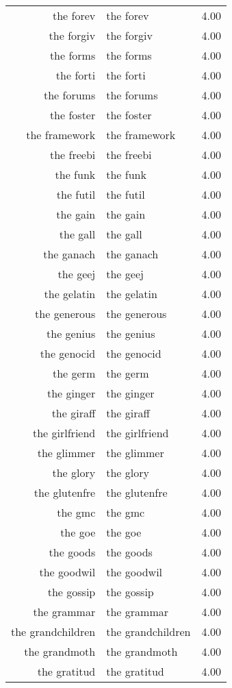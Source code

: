 \begin{table}[ht]
\begin{tabular}{rlr}
  the forev & the forev & 4.00 \\ 
  the forgiv & the forgiv & 4.00 \\ 
  the forms & the forms & 4.00 \\ 
  the forti & the forti & 4.00 \\ 
  the forums & the forums & 4.00 \\ 
  the foster & the foster & 4.00 \\ 
  the framework & the framework & 4.00 \\ 
  the freebi & the freebi & 4.00 \\ 
  the funk & the funk & 4.00 \\ 
  the futil & the futil & 4.00 \\ 
  the gain & the gain & 4.00 \\ 
  the gall & the gall & 4.00 \\ 
  the ganach & the ganach & 4.00 \\ 
  the geej & the geej & 4.00 \\ 
  the gelatin & the gelatin & 4.00 \\ 
  the generous & the generous & 4.00 \\ 
  the genius & the genius & 4.00 \\ 
  the genocid & the genocid & 4.00 \\ 
  the germ & the germ & 4.00 \\ 
  the ginger & the ginger & 4.00 \\ 
  the giraff & the giraff & 4.00 \\ 
  the girlfriend & the girlfriend & 4.00 \\ 
  the glimmer & the glimmer & 4.00 \\ 
  the glory & the glory & 4.00 \\ 
  the glutenfre & the glutenfre & 4.00 \\ 
  the gmc & the gmc & 4.00 \\ 
  the goe & the goe & 4.00 \\ 
  the goods & the goods & 4.00 \\ 
  the goodwil & the goodwil & 4.00 \\ 
  the gossip & the gossip & 4.00 \\ 
  the grammar & the grammar & 4.00 \\ 
  the grandchildren & the grandchildren & 4.00 \\ 
  the grandmoth & the grandmoth & 4.00 \\ 
  the gratitud & the gratitud & 4.00 \\ 

\end{tabular}
\end{table}
